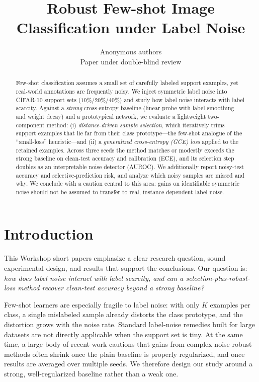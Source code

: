 \documentclass{article}
\title{Robust Few-shot Image Classification under Label Noise}
\author{Anonymous authors\\
Paper under double-blind review}
\begin{document}
\maketitle

\thispagestyle{fancy}
\pagestyle{fancy}
\fancyhf{}
\fancyfoot[C]{\thepage}

\begin{abstract}
Few-shot classification assumes a small set of carefully labeled support examples, yet
real-world annotations are frequently noisy. We inject symmetric label noise into CIFAR-10
support sets ($10\%$/$20\%$/$40\%$) and study how label noise interacts with label scarcity.
Against a \emph{strong} cross-entropy baseline (linear probe with label smoothing and weight
decay) and a prototypical network, we evaluate a lightweight two-component method:
(i) \emph{distance-driven sample selection}, which iteratively trims support examples that
lie far from their class prototype---the few-shot analogue of the ``small-loss''
heuristic---and (ii) a \emph{generalized cross-entropy (GCE) loss} applied to the retained
examples. Across three seeds the method matches or modestly exceeds the strong baseline on
clean-test accuracy and calibration (ECE), and its selection step doubles as an interpretable
noise detector (AUROC). We additionally report noisy-test accuracy and selective-prediction
risk, and analyze which noisy samples are missed and why. We conclude with a caution central
to this area: gains on identifiable symmetric noise should not be assumed to transfer to
real, instance-dependent label noise.
\end{abstract}

\section{Introduction}
\label{sec:intro}

This Workshop short papers emphasize a clear research question, sound experimental design, and
results that support the conclusions. Our question is: \emph{how does label noise interact
with label scarcity, and can a selection-plus-robust-loss method recover clean-test accuracy
beyond a strong baseline?}

Few-shot learners are especially fragile to label noise: with only $K$ examples per class, a
single mislabeled sample already distorts the class prototype, and the distortion grows with
the noise rate. Standard label-noise remedies built for large datasets are not directly
applicable when the support set is tiny. At the same time, a large body of recent work
cautions that gains from complex noise-robust methods often shrink once the plain baseline is
properly regularized, and once results are averaged over multiple seeds. We therefore design
our study around a strong, well-regularized baseline rather than a weak one.
\end{document}
